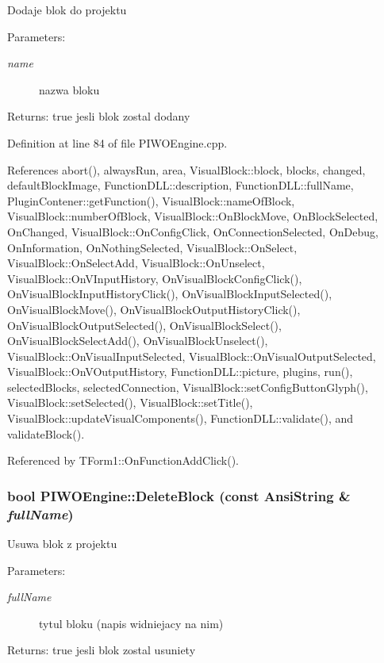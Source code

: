 Dodaje blok do projektu \begin{Desc}
\item[Parameters:]
\begin{description}
\item[{\em name}]nazwa bloku \end{description}
\end{Desc}
\begin{Desc}
\item[Returns:]true jesli blok zostal dodany \end{Desc}


Definition at line 84 of file PIWOEngine.cpp.

References abort(), alwaysRun, area, VisualBlock::block, blocks, changed, defaultBlockImage, FunctionDLL::description, FunctionDLL::fullName, PluginContener::getFunction(), VisualBlock::nameOfBlock, VisualBlock::numberOfBlock, VisualBlock::OnBlockMove, OnBlockSelected, OnChanged, VisualBlock::OnConfigClick, OnConnectionSelected, OnDebug, OnInformation, OnNothingSelected, VisualBlock::OnSelect, VisualBlock::OnSelectAdd, VisualBlock::OnUnselect, VisualBlock::OnVInputHistory, OnVisualBlockConfigClick(), OnVisualBlockInputHistoryClick(), OnVisualBlockInputSelected(), OnVisualBlockMove(), OnVisualBlockOutputHistoryClick(), OnVisualBlockOutputSelected(), OnVisualBlockSelect(), OnVisualBlockSelectAdd(), OnVisualBlockUnselect(), VisualBlock::OnVisualInputSelected, VisualBlock::OnVisualOutputSelected, VisualBlock::OnVOutputHistory, FunctionDLL::picture, plugins, run(), selectedBlocks, selectedConnection, VisualBlock::setConfigButtonGlyph(), VisualBlock::setSelected(), VisualBlock::setTitle(), VisualBlock::updateVisualComponents(), FunctionDLL::validate(), and validateBlock().

Referenced by TForm1::OnFunctionAddClick().\hypertarget{classPIWOEngine_d55f140db8722ff1601fa675ec779e1d}{
\subsubsection[DeleteBlock]{\setlength{\rightskip}{0pt plus 5cm}bool PIWOEngine::DeleteBlock (const AnsiString \& {\em fullName})}}
\label{classPIWOEngine_d55f140db8722ff1601fa675ec779e1d}


Usuwa blok z projektu \begin{Desc}
\item[Parameters:]
\begin{description}
\item[{\em fullName}]tytul bloku (napis widniejacy na nim) \end{description}
\end{Desc}
\begin{Desc}
\item[Returns:]true jesli blok zostal usuniety \end{Desc}


